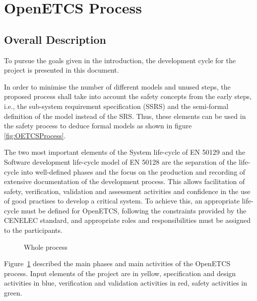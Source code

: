 
\section{OpenETCS Process}


\subsection{Overall Description}
\label{sec:overall_description}


To pursue the goals given in the introduction, the development cycle for the project is presented in this document.

In order to minimise the number of different models and unused steps, the proposed process shall take into account the safety concepts from the early steps, i.e., the sub-system requirement specification (SSRS) and the semi-formal definition of the model instead of the SRS. Thus, these elements can be used in the safety process to deduce formal models as shown in figure \ref{fig:OETCSProcess}.

The two most important elements of the System life-cycle of EN 50129 and the Software development life-cycle model of EN
50128 are the separation of the life-cycle into well-defined
phases and the focus on the production and recording of extensive documentation of the
development process. This allows facilitation of safety, verification, validation and assessment activities and confidence in the use of good practises to develop a critical system. To achieve this, an appropriate life-cycle
must be defined for OpenETCS, following the constraints provided by the CENELEC standard, and appropriate roles and responsibilities must be assigned to the participants.

 \begin{figure}
  \centering
  \caption{Whole process}
  \label{fig:whole_process}
\end{figure}

Figure~\ref{fig:whole_process} described the main phases and main activities of the OpenETCS process.
Input elements of the project are in yellow, specification and design activities in blue, verification and validation activities in red, safety activities in green.

